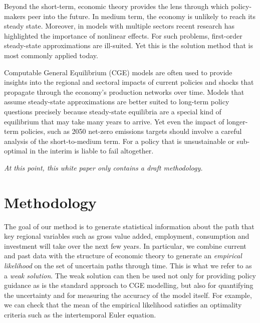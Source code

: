 \documentclass[12pt,a4paper,twoside, draft]{article}
\begin{document}
Beyond the short-term, economic theory provides the lens through which
policy-makers peer into the future. 
In medium term, the economy is unlikely to reach its steady state. 
Moreover, in models with multiple sectors recent research has highlighted
the importance of nonlinear effects.
For such problems, first-order steady-state approximations are ill-suited.
Yet this is the solution method that is most commonly applied today.

Computable General Equilibrium (CGE)
models are often used to provide insights into the regional and sectoral
impacts of current policies and shocks that propagate through the economy's
production networks over time.
Models that assume steady-state approximations are better suited to
long-term policy questions precisely because steady-state equilibria are a
special kind of equilibrium that may take many years to arrive.
Yet even the impact of longer-term policies, such as 2050 net-zero emissions
targets should involve a careful analysis of the short-to-medium term.
For a policy that is unsustainable or sub-optimal in the interim is liable to
fail altogether.

\emph{At this point, this white paper only contains a draft methodology.}

\section{Methodology}\label{sec-methodology}
The goal of our method is to generate statistical information about the path
that key regional variables such as gross value added, employment, consumption
and investment will take over the next few years.
In particular, we combine current and past data with the structure of economic
theory to generate an \emph{empirical likelihood}
\citet{Owen-Empirical_likelihood} on the set of uncertain paths through time.
This is what we refer to as a \emph{weak solution}.
The weak solution can then be used not only for providing policy guidance as is
the standard approach to CGE modelling, but also for quantifying the
uncertainty and for measuring the accuracy of the model itself.
For example, we can check that the mean of the empirical likelihood
satisfies an optimality criteria such as the intertemporal Euler equation. 
\end{document}

